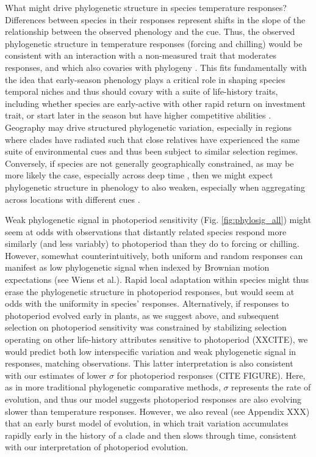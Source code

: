 \documentclass{article}\usepackage[]{graphicx}\usepackage[]{color}
\begin{document}
What might drive phylogenetic structure in species temperature responses? Differences between species in their responses represent shifts in the slope of the relationship between the observed phenology and the cue. Thus, the observed phylogenetic structure in temperature responses (forcing and chilling) would be consistent with an interaction with a non-measured trait that moderates responses, and which also covaries with phylogeny \citep{davies2019phylogenetically}. This fits fundamentally with the idea that early-season phenology plays a critical role in shaping species temporal niches \citep{gotelli1996} and thus should covary with a suite of life-history traits, including whether species are early-active with other rapid return on investment trait, or start later in the season but have higher competitive abilities \citep[e.g.,][]{Grime:1977sw,wolkovich2014aob}. Geography may drive structured phylogenetic variation, especially in regions where clades have radiated such that close relatives have experienced the same suite of environmental cues and thus been subject to similar selection regimes. Conversely, if species are not generally geographically constrained, as may be more likely the case, especially across deep time \citep{fitzturelli2006}, then we might expect phylogenetic structure in phenology to also weaken, especially when aggregating across locations with different cues \citep{davies2013phylogenetic}.

Weak phylogenetic signal in photoperiod sensitivity (Fig. \ref{fig:phylosig_all}) might seem at odds with observations that distantly related species respond more similarly (and less variably) to photoperiod than they do to forcing or chilling. However, somewhat counterintuitively, both uniform and random responses can manifest as low phylogenetic signal when indexed by Brownian motion expectations (see Wiens et al.). Rapid local adaptation within species might thus erase the phylogenetic structure in photoperiod responses, but would seem at odds with the uniformity in species' responses. Alternatively, if responses to photoperiod evolved early in plants, as we suggest above, and subsequent selection on photoperiod sensitivity was constrained by stabilizing selection operating on other life-history attributes sensitive to photoperiod (XXCITE), we would predict both low interspecific variation and weak phylogenetic signal in responses, matching observations. This latter interpretation is also consistent with our estimates of lower $\sigma$ for photoperiod responses (CITE FIGURE). Here, as in more traditional phylogenetic comparative methods, $\sigma$ represents the rate of evolution, and thus our model suggests photoperiod responses are also evolving slower than temperature responses. However, we also reveal (see Appendix XXX) that an early burst model of evolution, in which trait variation accumulates rapidly early in the history of a clade and then slows through time, consistent with our interpretation of photoperiod evolution.
\end{document}
